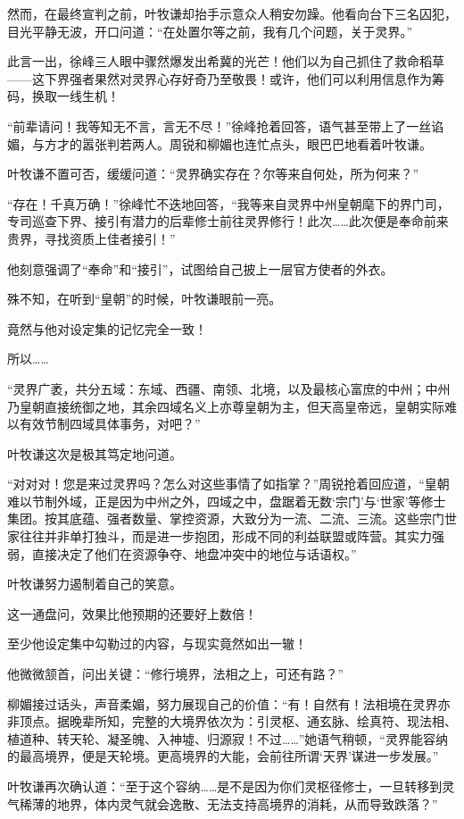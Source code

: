 然而，在最终宣判之前，叶牧谦却抬手示意众人稍安勿躁。他看向台下三名囚犯，目光平静无波，开口问道：“在处置尔等之前，我有几个问题，关于灵界。”

此言一出，徐峰三人眼中骤然爆发出希冀的光芒！他们以为自己抓住了救命稻草——这下界强者果然对灵界心存好奇乃至敬畏！或许，他们可以利用信息作为筹码，换取一线生机！

“前辈请问！我等知无不言，言无不尽！”徐峰抢着回答，语气甚至带上了一丝谄媚，与方才的嚣张判若两人。周锐和柳媚也连忙点头，眼巴巴地看着叶牧谦。

叶牧谦不置可否，缓缓问道：“灵界确实存在？尔等来自何处，所为何来？”

“存在！千真万确！”徐峰忙不迭地回答，“我等来自灵界中州皇朝麾下的界门司，专司巡查下界、接引有潜力的后辈修士前往灵界修行！此次……此次便是奉命前来贵界，寻找资质上佳者接引！”

他刻意强调了“奉命”和“接引”，试图给自己披上一层官方使者的外衣。

殊不知，在听到“皇朝”的时候，叶牧谦眼前一亮。

竟然与他对设定集的记忆完全一致！

所以……

“灵界广袤，共分五域：东域、西疆、南领、北境，以及最核心富庶的中州；中州乃皇朝直接统御之地，其余四域名义上亦尊皇朝为主，但天高皇帝远，皇朝实际难以有效节制四域具体事务，对吧？”

叶牧谦这次是极其笃定地问道。

“对对对！您是来过灵界吗？怎么对这些事情了如指掌？”周锐抢着回应道，“皇朝难以节制外域，正是因为中州之外，四域之中，盘踞着无数‘宗门’与‘世家’等修士集团。按其底蕴、强者数量、掌控资源，大致分为一流、二流、三流。这些宗门世家往往并非单打独斗，而是进一步抱团，形成不同的利益联盟或阵营。其实力强弱，直接决定了他们在资源争夺、地盘冲突中的地位与话语权。”

叶牧谦努力遏制着自己的笑意。

这一通盘问，效果比他预期的还要好上数倍！

至少他设定集中勾勒过的内容，与现实竟然如出一辙！

他微微颔首，问出关键：“修行境界，法相之上，可还有路？”

柳媚接过话头，声音柔媚，努力展现自己的价值：“有！自然有！法相境在灵界亦非顶点。据晚辈所知，完整的大境界依次为：引灵枢、通玄脉、绘真符、现法相、植道种、转天轮、凝圣魄、入神墟、归源寂！不过……”她语气稍顿，“灵界能容纳的最高境界，便是天轮境。更高境界的大能，会前往所谓‘天界’谋进一步发展。”

叶牧谦再次确认道：“至于这个容纳……是不是因为你们灵枢径修士，一旦转移到灵气稀薄的地界，体内灵气就会逸散、无法支持高境界的消耗，从而导致跌落？”

